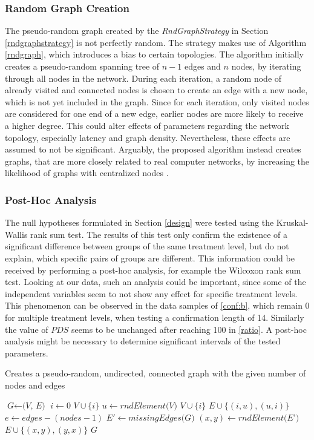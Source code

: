 \documentclass[a4paper,12pt,twoside]{report}
\begin{document}
\subsubsection{Random Graph Creation}
The pseudo-random graph created by the \textit{RndGraphStrategy} in Section \ref{rndgraphstrategy} is not perfectly random. The strategy makes use of Algorithm \ref{rndgraph}, which introduces a bias to certain topologies. The algorithm initially creates a pseudo-random spanning tree of $n-1$ edges and $n$ nodes, by iterating through all nodes in the network. During each iteration, a random node of already visited and connected nodes is chosen to create an edge with a new node, which is not yet included in the graph. Since for each iteration, only visited nodes are considered for one end of a new edge, earlier nodes are more likely to receive a higher degree. This could alter effects of parameters regarding the network topology, especially latency and graph density. Nevertheless, these effects are assumed to not be significant. Arguably, the proposed algorithm instead creates graphs, that are more closely related to real computer networks, by increasing the likelihood of graphs with centralized nodes \cite{stackoverflow}.
\subsubsection{Post-Hoc Analysis}
The null hypotheses formulated in Section \ref{design} were tested using the Kruskal-Wallis rank sum test. The results of this test only confirm the existence of a significant difference between groups of the same treatment level, but do not explain, which specific pairs of groups are different. This information could be received by performing a post-hoc analysis, for example the Wilcoxon rank sum test. Looking at our data, such an analysis could be important, since some of the independent variables seem to not show any effect for specific treatment levels. This phenomenon can be observed in the data samples of \autoref{conf:b}, which remain 0 for multiple treatment levels, when testing a confirmation length of 14. Similarly the value of $PDS$ seems to be unchanged after reaching 100 in \autoref{ratio}. A post-hoc analysis might be necessary to determine significant intervals of the tested parameters.

\begin{algorithm}
\caption{Creates a pseudo-random, undirected, connected graph with the given number of nodes and edges}\label{rndgraph}
\begin{algorithmic}[1]
\State $\textit{G} \gets \textit{(V, E)}$
\State $i \gets 0$
\State $V \cup \{i \}$
\State $u \gets \textit{rndElement(V)}$
\State $V \cup \{i \}$
\State $E \cup \{(i,u),(u,i) \}$
\EndWhile
\State $e \gets edges - (nodes-1)$
\State $E' \gets \textit{missingEdges(G)}$
\State $(x,y) \gets \textit{rndElement(E')}$
\State $E \cup \{(x,y),(y,x) \}$
\EndWhile
\State \Return $G$
\EndProcedure
\end{algorithmic}
\end{algorithm}
\end{document}
